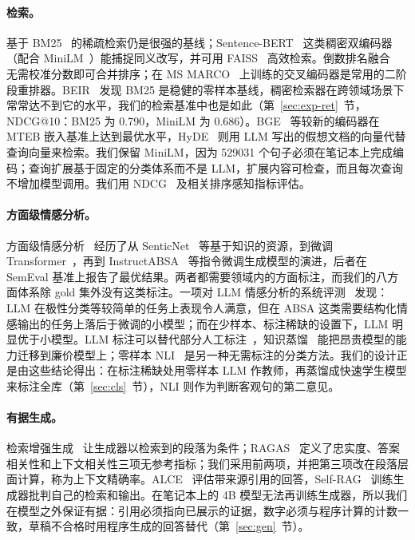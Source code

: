 \documentclass[10pt,twocolumn,a4paper]{article}
\newcommand{\sref}[1]{第~\ref{#1}~节}
\begin{document}
\paragraph{检索。}基于 BM25~\cite{bm25} 的稀疏检索仍是很强的基线；Sentence-BERT~\cite{sbert} 这类稠密双编码器（配合 MiniLM~\cite{minilm}）能捕捉同义改写，并可用 FAISS~\cite{faiss} 高效检索。倒数排名融合~\cite{rrf} 无需校准分数即可合并排序；在 MS MARCO~\cite{msmarco,nogueira2019} 上训练的交叉编码器是常用的二阶段重排器。BEIR~\cite{beir} 发现 BM25 是稳健的零样本基线，稠密检索器在跨领域场景下常常达不到它的水平，我们的检索基准中也是如此（\sref{sec:exp-ret}，NDCG@10：BM25 为 0.790，MiniLM 为 0.686）。BGE~\cite{bge} 等较新的编码器在 MTEB 嵌入基准上达到最优水平，HyDE~\cite{hyde} 则用 LLM 写出的假想文档的向量代替查询向量来检索。我们保留 MiniLM，因为 \num{529031} 个句子必须在笔记本上完成编码；查询扩展基于固定的分类体系而不是 LLM，扩展内容可检查，而且每次查询不增加模型调用。我们用 NDCG~\cite{ndcg} 及相关排序感知指标评估。

\paragraph{方面级情感分析。}方面级情感分析~\cite{pontiki2014,zhang2023absasurvey} 经历了从 SenticNet~\cite{senticnet} 等基于知识的资源，到微调 Transformer~\cite{xu2019bert}，再到 InstructABSA~\cite{instructabsa} 等指令微调生成模型的演进，后者在 SemEval 基准上报告了最优结果。两者都需要领域内的方面标注，而我们的八方面体系除 gold 集外没有这类标注。一项对 LLM 情感分析的系统评测~\cite{zhang2024reality} 发现：LLM 在极性分类等较简单的任务上表现令人满意，但在 ABSA 这类需要结构化情感输出的任务上落后于微调的小模型；而在少样本、标注稀缺的设置下，LLM 明显优于小模型。LLM 标注可以替代部分人工标注~\cite{gilardi2023}，知识蒸馏~\cite{hinton2015} 能把昂贵模型的能力迁移到廉价模型上；零样本 NLI~\cite{yin2019,laurer2023} 是另一种无需标注的分类方法。我们的设计正是由这些结论得出：在标注稀缺处用零样本 LLM 作教师，再蒸馏成快速学生模型来标注全库（\sref{sec:cls}），NLI 则作为判断客观句的第二意见。

\paragraph{有据生成。}检索增强生成~\cite{rag} 让生成器以检索到的段落为条件；RAGAS~\cite{ragas} 定义了忠实度、答案相关性和上下文相关性三项无参考指标；我们采用前两项，并把第三项改在段落层面计算，称为上下文精确率。ALCE~\cite{alce} 评估带来源引用的回答，Self-RAG~\cite{selfrag} 训练生成器批判自己的检索和输出。在笔记本上的 4B 模型无法再训练生成器，所以我们在模型之外保证有据：引用必须指向已展示的证据，数字必须与程序计算的计数一致，草稿不合格时用程序生成的回答替代（\sref{sec:gen}）。
\end{document}
